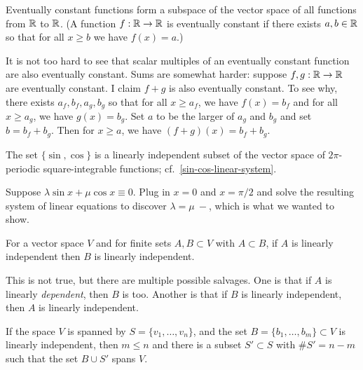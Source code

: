 \documentclass{homework}
\begin{document}
\begin{problem}\label{eventually-constant}Eventually constant functions form a subspace of the vector space of
  all functions from $\mathbb{R}$ to $\mathbb{R}$.  (A function $f : \mathbb{R} \to \mathbb{R}$ is
  eventually constant if there exists $a,b \in \mathbb{R}$ so that for all
  $x \geq b$ we have $f(x) = a$.)
\end{problem}

\begin{solution}
  It is not too hard to see that scalar multiples of an eventually
  constant function are also eventually constant.  Sums are somewhat
  harder: suppose $f, g : \mathbb{R} \to \mathbb{R}$ are eventually constant.  I claim
  $f + g$ is also eventually constant.  To see why, there exists
  $a_f,b_f,a_g,b_g$ so that for all $x \geq a_f$, we have $f(x) = b_f$
  and for all $x \geq a_g$, we have $g(x) = b_g$.  Set $a$ to be the
  larger of $a_g$ and $b_g$ and set $b = b_f + b_g$.  Then for
  $x \geq a$, we have $(f+g)(x) = b_f + b_g$.
\end{solution}

\begin{problem}\label{sin-cos-indie}The set $\{ \sin, \cos \}$ is a linearly independent subset of the
  vector space of $2\pi$-periodic square-integrable functions;
  cf.~\ref{sin-cos-linear-system}.
\end{problem}

\begin{solution}
  Suppose $\lambda \sin x + \mu \cos x \equiv 0$.  Plug in $x = 0$ and
  $x = \pi/2$ and solve the resulting system of linear equations to
  discover $\lambda = \mu \ -$, which is what we wanted to show.
\end{solution}

\begin{problem}
  For a vector space $V$ and for finite sets $A, B \subset V$ with
  $A \subset B$, if $A$ is linearly independent then $B$ is linearly
  independent.
\end{problem}

\begin{solution}
  This is not true, but there are multiple possible salvages.  One is
  that if $A$ is linearly \textit{dependent}, then $B$ is too.
  Another is that if $B$ is linearly independent, then $A$ is linearly
  independent.
\end{solution}

\begin{problem}\label{steinitz-exchange-lemma}If the space $V$ is spanned by $S = \{v_1,\ldots,v_n\}$,
  and the set $B = \{b_1,\ldots,b_m \} \subset V$ is linearly
  independent, then $m \leq n$ and there is a subset $S' \subset S$
  with $\# S' = n-m$ such that the set $B \cup S'$ spans $V$.
\end{problem}
\end{document}
